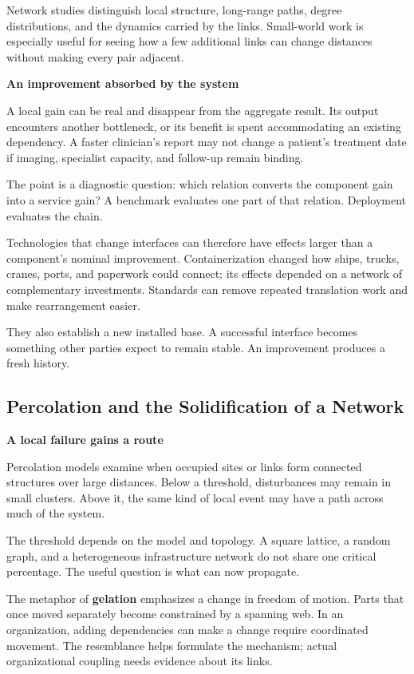 \documentclass[11pt,openany]{book}
\newcommand{\term}[1]{\textbf{#1}}
\newcommand{\subhead}[1]{\par\medskip\noindent\textbf{#1}\par\nobreak\smallskip}
\begin{document}
Network studies distinguish local structure, long-range paths, degree distributions, and the dynamics carried by the links.\cite{boccaletti2006complex,watts1998collective} Small-world work is especially useful for seeing how a few additional links can change distances without making every pair adjacent.\cite{milgram1967smallworld,travers1969experimental}

\subhead{An improvement absorbed by the system}

A local gain can be real and disappear from the aggregate result. Its output encounters another bottleneck, or its benefit is spent accommodating an existing dependency. A faster clinician's report may not change a patient's treatment date if imaging, specialist capacity, and follow-up remain binding.

The point is a diagnostic question: which relation converts the component gain into a service gain? A benchmark evaluates one part of that relation. Deployment evaluates the chain.

Technologies that change interfaces can therefore have effects larger than a component's nominal improvement. Containerization changed how ships, trucks, cranes, ports, and paperwork could connect; its effects depended on a network of complementary investments.\cite{bernhofen2016estimating} Standards can remove repeated translation work and make rearrangement easier.

They also establish a new installed base. A successful interface becomes something other parties expect to remain stable. An improvement produces a fresh history.

\subsection{Percolation and the Solidification of a Network}

\subhead{A local failure gains a route}

Percolation models examine when occupied sites or links form connected structures over large distances.\cite{broadbent1957,erdos1959} Below a threshold, disturbances may remain in small clusters. Above it, the same kind of local event may have a path across much of the system.

The threshold depends on the model and topology. A square lattice, a random graph, and a heterogeneous infrastructure network do not share one critical percentage. The useful question is what can now propagate.

The metaphor of \term{gelation} emphasizes a change in freedom of motion. Parts that once moved separately become constrained by a spanning web. In an organization, adding dependencies can make a change require coordinated movement. The resemblance helps formulate the mechanism; actual organizational coupling needs evidence about its links.
\end{document}
